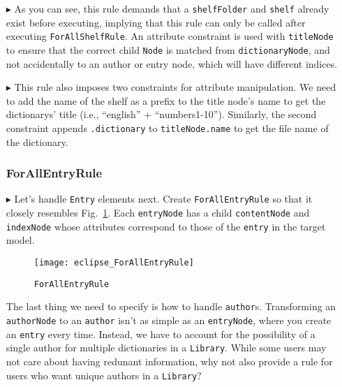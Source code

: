 \begin{itemize}
\newpage

\item[$\blacktriangleright$] As you can see, this rule demands that a \texttt{shelfFolder} and \texttt{shelf} already exist before executing, implying that this
rule can only be called after executing \texttt{ForAllShelfRule}. An attribute constraint is used with \texttt{titleNode} to ensure that the correct child
\texttt{Node} is matched from \texttt{dictionaryNode}, and not accidentally to an author or entry node, which will have different indices.

\item[$\blacktriangleright$] This rule also imposes two constraints for attribute manipulation. We need to add the name of the shelf as a prefix to the title
node's name to get the dictionarys' title (i.e., ``english'' + ``numbers1-10''). Similarly, the second constraint appends \texttt{.dictionary} to
\texttt{titleNode.name} to get the file name of the dictionary.

\subsubsection{ForAllEntryRule} %

\item[$\blacktriangleright$] Let's handle \texttt{Entry} elements next. Create \texttt{ForAllEntryRule} so that it closely resembles
Fig.~\ref{eclipse:ForAllEntryRule}. Each \texttt{entryNode} has a child \texttt{contentNode} and \texttt{indexNode} whose attributes correspond to
those of the \texttt{entry} in the target model.

\begin{figure}[htbp]
\begin{center}
  \texttt{[image: eclipse\_ForAllEntryRule]}
  \caption{\texttt{ForAllEntryRule}}
  \label{eclipse:ForAllEntryRule}
\end{center}
\end{figure}

\newpage

The last thing we need to specify is how to handle \texttt{author}s. Transforming an \texttt{authorNode} to an \texttt{author} isn't as simple as
an \texttt{entryNode}, where you create an \texttt{entry} every time. Instead, we have to account for the possibility of a single author
for multiple dictionaries in a \texttt{Library}. While some users may not care about having redunant information, why not also provide a rule for users
who want unique authors in a \texttt{Library}?


\end{itemize}
